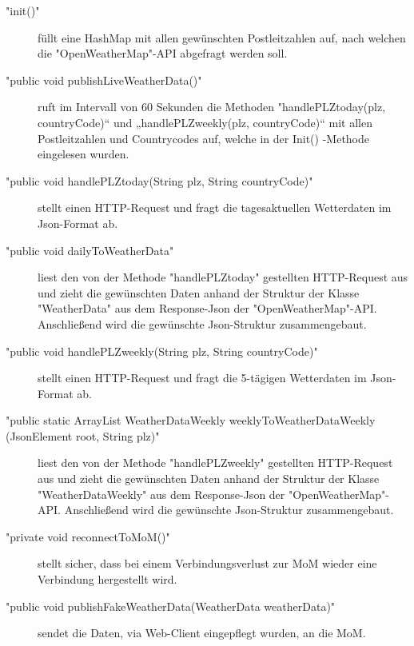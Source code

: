 \begin{description}
\item["init()"] füllt eine HashMap mit allen gewünschten Postleitzahlen auf, nach welchen die "OpenWeatherMap"-API abgefragt werden soll.
\item["public void publishLiveWeatherData()"] ruft im Intervall von 60 Sekunden die Methoden "handlePLZtoday(plz, countryCode)“ und „handlePLZweekly(plz, countryCode)“ mit allen Postleitzahlen und Countrycodes auf, welche in der Init() -Methode eingelesen wurden. 
\item["public void handlePLZtoday(String plz, String countryCode)"] stellt einen HTTP-Request und fragt die tagesaktuellen Wetterdaten im Json-Format ab.
\item["public void dailyToWeatherData"] liest den von der Methode "handlePLZtoday" gestellten HTTP-Request aus und zieht die gewünschten Daten anhand der Struktur der Klasse "WeatherData" aus dem Response-Json der "OpenWeatherMap"-API. Anschließend wird  die gewünschte Json-Struktur zusammengebaut. 
\item["public void handlePLZweekly(String plz, String countryCode)"]stellt einen HTTP-Request und fragt die 5-tägigen Wetterdaten im Json-Format ab.
\item["public static ArrayList WeatherDataWeekly weeklyToWeatherDataWeekly
(JsonElement root, String plz)" ]liest den von der Methode "handlePLZweekly" gestellten HTTP-Request aus und zieht die gewünschten Daten anhand der Struktur der Klasse "WeatherDataWeekly" aus dem Response-Json der "OpenWeatherMap"-API. Anschließend wird die gewünschte Json-Struktur zusammengebaut.
\item["private void reconnectToMoM()"] stellt sicher, dass bei einem Verbindungsverlust zur MoM wieder eine Verbindung hergestellt wird. 
\item["public void publishFakeWeatherData(WeatherData weatherData)"] sendet die Daten, via Web-Client eingepflegt wurden, an die MoM. 
\end{description}

